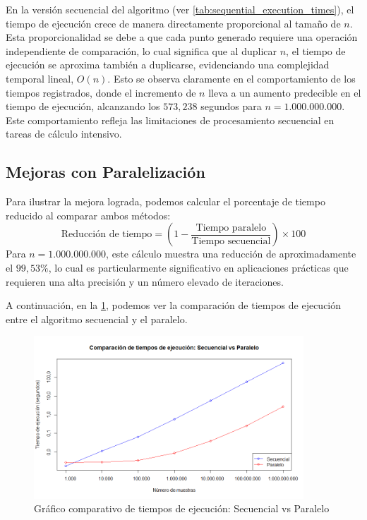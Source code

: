 \documentclass[a4paper, 10pt, onecolumn]{IEEEtran}
\begin{document}
En la versión secuencial del algoritmo (ver \cref{tab:sequential_execution_times}), el tiempo de ejecución crece de manera directamente proporcional al tamaño de $n$. Esta proporcionalidad se debe a que cada punto generado requiere una operación independiente de comparación, lo cual significa que al duplicar $n$, el tiempo de ejecución se aproxima también a duplicarse, evidenciando una complejidad temporal lineal, $O(n)$. Esto se observa claramente en el comportamiento de los tiempos registrados, donde el incremento de $n$ lleva a un aumento predecible en el tiempo de ejecución, alcanzando los $573,238$ segundos para $n = 1.000.000.000$. Este comportamiento refleja las limitaciones de procesamiento secuencial en tareas de cálculo intensivo.

\subsection{Mejoras con Paralelización}
Para ilustrar la mejora lograda, podemos calcular el porcentaje de tiempo reducido al comparar ambos métodos:
\[
\text{Reducción de tiempo} = \left(1 - \frac{\text{Tiempo paralelo}}{\text{Tiempo secuencial}}\right) \times 100
\]
Para $n = 1.000.000.000$, este cálculo muestra una reducción de aproximadamente el $99,53\%$, lo cual es particularmente significativo en aplicaciones prácticas que requieren una alta precisión y un número elevado de iteraciones.

A continuación, en la \cref{fig:efficiency}, podemos ver la comparación de tiempos de ejecución entre el algoritmo secuencial y el paralelo.

\begin{figure}[H]
  \centering
  \includegraphics[width=0.9\textwidth]{./img/efficiency.png}
  \caption{Gráfico comparativo de tiempos de ejecución: Secuencial vs Paralelo}
  \label{fig:efficiency}
\end{figure}
\end{document}
